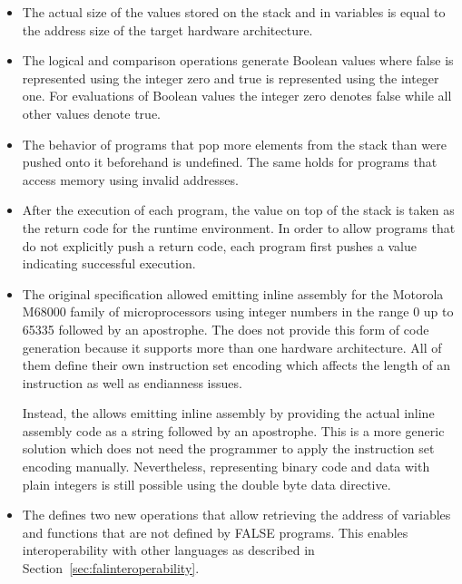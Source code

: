 \begin{itemize}

\item
The actual size of the values stored on the stack and in variables is equal to the address size of the target hardware architecture.

\item
The logical and comparison operations generate Boolean values where false is represented using the integer zero and true is represented using the integer one.
For evaluations of Boolean values the integer zero denotes false while all other values denote true.

\item
The behavior of programs that pop more elements from the stack than were pushed onto it beforehand is undefined.
The same holds for programs that access memory using invalid addresses.

\item
After the execution of each program, the value on top of the stack is taken as the return code for the runtime environment.
In order to allow programs that do not explicitly push a return code, each program first pushes a value indicating successful execution.

\item
The original specification allowed emitting inline assembly for the Motorola M68000 family of microprocessors using integer numbers in the range 0 up to 65335 followed by an apostrophe.
The \ecs{} does not provide this form of code generation because it supports more than one hardware architecture.
All of them define their own instruction set encoding which affects the length of an instruction as well as endianness issues.

Instead, the \ecs{} allows emitting inline assembly by providing the actual inline assembly code as a string followed by an apostrophe.
This is a more generic solution which does not need the programmer to apply the instruction set encoding manually.
Nevertheless, representing binary code and data with plain integers is still possible using the double byte data directive.
\seeassembly\seemabk

\item
The \ecs{} defines two new operations that allow retrieving the address of variables and functions that are not defined by FALSE programs.
This enables interoperability with other languages as described in Section~\ref{sec:falinteroperability}.

\end{itemize}

